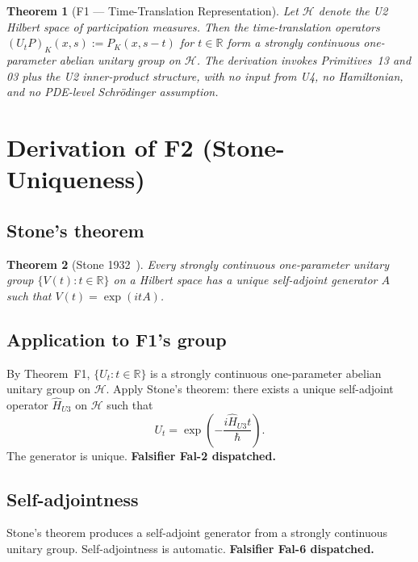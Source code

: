 \documentclass[11pt,a4paper]{article}
\newtheorem{theorem}{Theorem}[section]
\begin{document}
\begin{theorem}[F1 --- Time-Translation Representation]
Let $\mathcal{H}$ denote the U2 Hilbert space of participation measures. Then the time-translation operators $(U_t P)_K(x, s) := P_K(x, s - t)$ for $t \in \mathbb{R}$ form a strongly continuous one-parameter abelian unitary group on $\mathcal{H}$. The derivation invokes Primitives~13 and 03 plus the U2 inner-product structure, with no input from U4, no Hamiltonian, and no PDE-level Schr\"odinger assumption.
\end{theorem}

\section{Derivation of F2 (Stone-Uniqueness)}\label{sec:F2}

\subsection{Stone's theorem}

\begin{theorem}[Stone 1932~\cite{stone}]
Every strongly continuous one-parameter unitary group $\{V(t) : t \in \mathbb{R}\}$ on a Hilbert space has a unique self-adjoint generator $A$ such that $V(t) = \exp(itA)$.
\end{theorem}

\subsection{Application to F1's group}

By Theorem~F1, $\{U_t : t \in \mathbb{R}\}$ is a strongly continuous one-parameter abelian unitary group on $\mathcal{H}$. Apply Stone's theorem: there exists a unique self-adjoint operator $\hat{H}_{U3}$ on $\mathcal{H}$ such that
\begin{equation}
U_t = \exp\!\left( -\frac{i \hat{H}_{U3} t}{\hbar} \right). \label{eq:Ut-stone}
\end{equation}
The generator is unique. \textbf{Falsifier Fal-2 dispatched.}

\subsection{Self-adjointness}

Stone's theorem produces a self-adjoint generator from a strongly continuous unitary group. Self-adjointness is automatic. \textbf{Falsifier Fal-6 dispatched.}
\end{document}

